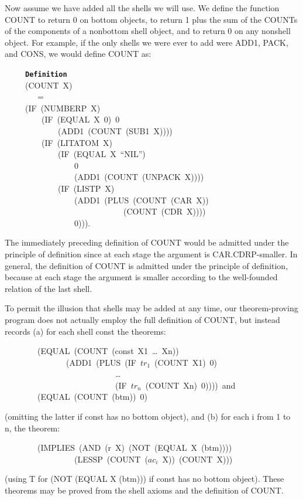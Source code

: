 \documentclass[11pt]{book}
\newenvironment{pubasis}{\begin{flushleft}\ttfamily\small}{\normalsize\rmfamily\end{flushleft}}
\newcommand{\axiomordefinition}[1]{\vspace{6pt}\texttt{\textbf{#1}}}
\begin{document}
Now assume  we have added all the shells  we will
use.  We define the function COUNT to return 0 on
bottom objects, to return 1 plus the sum of the COUNTs
of the components of a nonbottom  shell object, and to
return 0 on any nonshell object.  For example, if the only
shells we were ever to add were ADD1, PACK, and CONS, we
would define COUNT as:
\begin{pubasis}
~~~~~\axiomordefinition{Definition}\\
~~~~~(COUNT~X)\\
~~~~~~~~=\\
~~~~~(IF~(NUMBERP~X)\\
~~~~~~~~~(IF~(EQUAL~X~0)~0\\
~~~~~~~~~~~~~(ADD1~(COUNT~(SUB1~X))))\\
~~~~~~~~~(IF~(LITATOM~X)\\
~~~~~~~~~~~~~(IF~(EQUAL~X~``NIL'')\\
~~~~~~~~~~~~~~~~~0\\
~~~~~~~~~~~~~~~~~(ADD1~(COUNT~(UNPACK~X))))\\
~~~~~~~~~~~~~(IF~(LISTP~X)\\
~~~~~~~~~~~~~~~~~(ADD1~(PLUS~(COUNT~(CAR~X))\\
~~~~~~~~~~~~~~~~~~~~~~~~~~~~~(COUNT~(CDR~X))))\\
~~~~~~~~~~~~~~~~~0))).\\
\end{pubasis}
\nopagebreak\par\hrulefill\nopagebreak\par
The immediately preceding definition of COUNT would be admitted under the principle of
definition since at each stage the argument is
CAR.CDRP-smaller.
In general, the definition of COUNT is admitted under
the principle of definition, because at each stage the
argument is smaller according to the well-founded relation
of the last shell.

To permit the illusion that shells may be added at any time,
our theorem-proving program does not actually employ the 
full definition of COUNT, but instead records (a) for
each shell const the theorems:
\begin{pubasis}
~~~~~~~~(EQUAL~(COUNT~(const~X1~\ldots{}~Xn))\\
~~~~~~~~~~~~~~~(ADD1~(PLUS~(IF~$tr_{1}$~(COUNT~X1)~0)\\
~~~~~~~~~~~~~~~~~~~~~~~~~~~\ldots{}\\
~~~~~~~~~~~~~~~~~~~~~~~~~~~(IF~$tr_{n}$~(COUNT~Xn)~0))))~and\\

~~~~~~~~(EQUAL~(COUNT~(btm))~0)\\
\end{pubasis}
(omitting the latter if const has no bottom object),
and (b) for each i from 1 to n,
the theorem:
\begin{pubasis}
~~~~~~~~(IMPLIES~(AND~(r~X)~(NOT~(EQUAL~X~(btm))))\\
~~~~~~~~~~~~~~~~~(LESSP~(COUNT~($ac_{i}$~X))~(COUNT~X)))\\
\end{pubasis}
(using T for (NOT (EQUAL X  (btm))) if const has no bottom object).
These theorems may be proved from the shell axioms
and the definition of COUNT.
\end{document}
